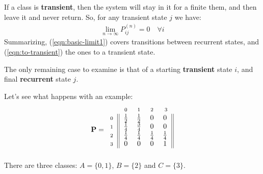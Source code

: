 \documentclass[../template.tex]{subfiles}
\begin{document}
If a class is \textbf{transient}, then the system will stay in it for a finite them, and then leave it and never return. So, for any transient state $j$ we have:
\begin{align} \label{eqn:to-transient}
    \lim_{n \to \infty} P_{ij}^{(n)} = 0 \quad \forall i
\end{align}
Summarizing, (\ref{eqn:basic-limit1}) covers transitions between recurrent states, and (\ref{eqn:to-transient}) the ones to a transient state.

The only remaining case to examine is that of a {starting \textbf{transient} state} $i$, and final \textbf{recurrent} state $j$. 

\medskip

Let's see what happens with an example:
\begin{align}\label{eqn:one-way1}
    \textbf{P} = \begin{blockarray}{l*{4}{c}}
        \begin{block}{l*{4}{>{\scriptstyle}c<{}}}
            & 0 & 1 & 2 & 3\\
        \end{block}
        \begin{block}{>{\scriptstyle}r<{}||*{4}{c}||}
            0 & \frac{1}{2}  & \frac{1}{2}  & 0 & 0\\
            1 & \frac{1}{4}  & \frac{3}{4}  & 0 & 0\\
            2 & \frac{1}{4}  & \frac{1}{4}  & \frac{1}{4}  & \frac{1}{4} \\
            3 & 0 & 0 & 0 & 1 \\
        \end{block}
    \end{blockarray}
\end{align}
There are three classes: $A=\{0,1\}$, $B=\{2\}$ and $C=\{3\}$.
\end{document}

